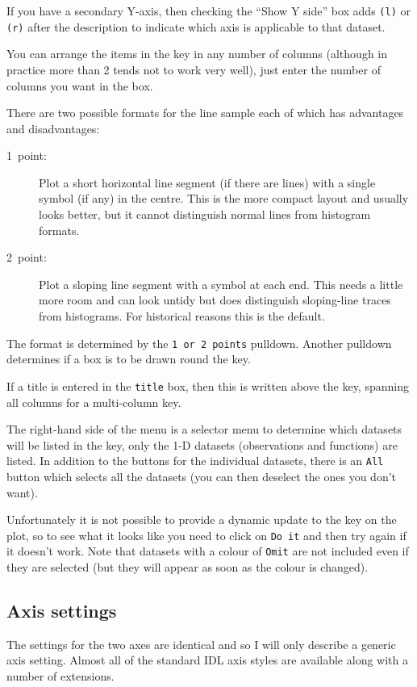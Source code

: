 \documentclass[11pt,twoside,english]{article}
\begin{document}
If you have a secondary Y-axis, then checking the ``Show Y side'' box
adds \texttt{(l)} or \texttt{(r)} after the description to indicate
which axis is applicable to that dataset.

You can arrange the items in the key in any number of columns (although
in practice more than 2 tends not to work very well), just enter the
number of columns you want in the box.

There are two possible formats for the line sample each of which has
advantages and disadvantages:

\begin{description}
\item [1~point:]Plot a short horizontal line segment (if there are
  lines) with a single symbol (if any) in the centre. This is the more
  compact layout and usually looks better, but it cannot distinguish
  normal lines from histogram formats.
\item [2~point:]Plot a sloping line segment with a symbol at each end.
  This needs a little more room and can look untidy but does
  distinguish sloping-line traces from histograms. For historical
  reasons this is the default.
\end{description}
The format is determined by the \texttt{1 or 2 points}
pulldown. Another pulldown determines if a box is to be drawn round the
key.

If a title is entered in the \texttt{title} box, then this is written
above the key, spanning all columns for a multi-column key.

The right-hand side of the menu is a selector menu to determine which
datasets will be listed in the key, only the 1-D datasets (observations
and functions) are listed. In addition to the buttons for the
individual datasets, there is an \texttt{All} button which selects all
the datasets (you can then deselect the ones you don't want).

Unfortunately it is not possible to provide a dynamic update to the key
on the plot, so to see what it looks like you need to click on
\texttt{Do it} and then try again if it doesn't work. Note that
datasets with a colour of \texttt{Omit} are not included even if they
are selected (but they will appear as soon as the colour is changed).


\subsection{Axis settings}

The settings for the two axes are identical and so I will only describe
a generic axis setting. Almost all of the standard IDL axis styles are
available along with a number of extensions.
\end{document}

